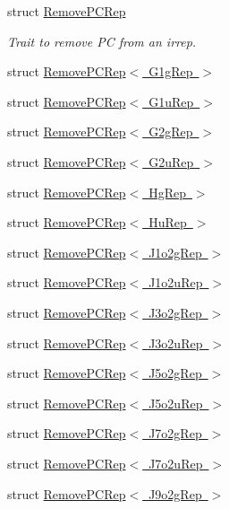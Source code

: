 \begin{DoxyCompactItemize}
struct \mbox{\hyperlink{structHadron_1_1RemovePCRep}{Remove\+P\+C\+Rep}}
\begin{DoxyCompactList}\small\item\em Trait to remove PC from an irrep. \end{DoxyCompactList}\item 
struct \mbox{\hyperlink{structHadron_1_1RemovePCRep_3_01G1gRep_01_4}{Remove\+P\+C\+Rep$<$ G1g\+Rep $>$}}
\item 
struct \mbox{\hyperlink{structHadron_1_1RemovePCRep_3_01G1uRep_01_4}{Remove\+P\+C\+Rep$<$ G1u\+Rep $>$}}
\item 
struct \mbox{\hyperlink{structHadron_1_1RemovePCRep_3_01G2gRep_01_4}{Remove\+P\+C\+Rep$<$ G2g\+Rep $>$}}
\item 
struct \mbox{\hyperlink{structHadron_1_1RemovePCRep_3_01G2uRep_01_4}{Remove\+P\+C\+Rep$<$ G2u\+Rep $>$}}
\item 
struct \mbox{\hyperlink{structHadron_1_1RemovePCRep_3_01HgRep_01_4}{Remove\+P\+C\+Rep$<$ Hg\+Rep $>$}}
\item 
struct \mbox{\hyperlink{structHadron_1_1RemovePCRep_3_01HuRep_01_4}{Remove\+P\+C\+Rep$<$ Hu\+Rep $>$}}
\item 
struct \mbox{\hyperlink{structHadron_1_1RemovePCRep_3_01J1o2gRep_01_4}{Remove\+P\+C\+Rep$<$ J1o2g\+Rep $>$}}
\item 
struct \mbox{\hyperlink{structHadron_1_1RemovePCRep_3_01J1o2uRep_01_4}{Remove\+P\+C\+Rep$<$ J1o2u\+Rep $>$}}
\item 
struct \mbox{\hyperlink{structHadron_1_1RemovePCRep_3_01J3o2gRep_01_4}{Remove\+P\+C\+Rep$<$ J3o2g\+Rep $>$}}
\item 
struct \mbox{\hyperlink{structHadron_1_1RemovePCRep_3_01J3o2uRep_01_4}{Remove\+P\+C\+Rep$<$ J3o2u\+Rep $>$}}
\item 
struct \mbox{\hyperlink{structHadron_1_1RemovePCRep_3_01J5o2gRep_01_4}{Remove\+P\+C\+Rep$<$ J5o2g\+Rep $>$}}
\item 
struct \mbox{\hyperlink{structHadron_1_1RemovePCRep_3_01J5o2uRep_01_4}{Remove\+P\+C\+Rep$<$ J5o2u\+Rep $>$}}
\item 
struct \mbox{\hyperlink{structHadron_1_1RemovePCRep_3_01J7o2gRep_01_4}{Remove\+P\+C\+Rep$<$ J7o2g\+Rep $>$}}
\item 
struct \mbox{\hyperlink{structHadron_1_1RemovePCRep_3_01J7o2uRep_01_4}{Remove\+P\+C\+Rep$<$ J7o2u\+Rep $>$}}
\item 
struct \mbox{\hyperlink{structHadron_1_1RemovePCRep_3_01J9o2gRep_01_4}{Remove\+P\+C\+Rep$<$ J9o2g\+Rep $>$}}
\item 

\end{DoxyCompactItemize}
